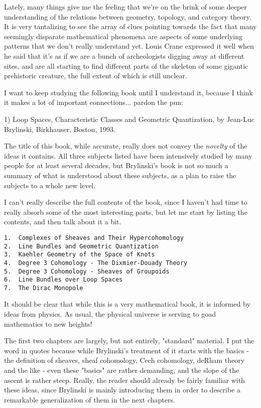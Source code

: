 

Lately, many things give me the feeling that we're on the brink of
some deeper understanding of the relations between geometry, topology,
and category theory.  It is very tantalizing to see the array of clues
pointing towards the fact that many seemingly disparate mathematical
phenomena are aspects of some underlying patterns that we don't really
understand yet.  Louis Crane expressed it well when he said that it's as
if we are a bunch of archeologists digging away at different sites,
and are all starting to find different parts of the skeleton of some
gigantic prehistoric creature, the full extent of which is still unclear.

I want to keep studying the following book until I understand it,
because I think it makes a lot of important connections... pardon the
pun:

1) Loop Spaces, Characteristic Classes and Geometric Quantization,
by Jean-Luc Brylinski, Birkhauser, Boston, 1993.

The title of this book, while accurate, really does not convey the
\emph{novelty} of the ideas it contains.  All three subjects listed have been
intensively studied by many people for at least several decades, but
Brylinski's book is not so much a summary of what is understood about
these subjects, as a plan to raise the subjects to a whole new level.

I can't really describe the full contents of the book, since I haven't
had time to really absorb some of the most interesting parts, but let me
start by listing the contents, and then talk about it a bit.

\begin{verbatim}
1.  Complexes of Sheaves and Their Hypercohomology
2.  Line Bundles and Geometric Quantization
3.  Kaehler Geometry of the Space of Knots
4.  Degree 3 Cohomology - The Dixmier-Douady Theory
5.  Degree 3 Cohomology - Sheaves of Groupoids
6.  Line Bundles over Loop Spaces
7.  The Dirac Monopole
\end{verbatim}
    

It should be clear that while this is a very mathematical book, it is
informed by ideas from physics.  As usual, the physical universe is
serving to goad mathematics to new heights!  

The first two chapters are largely, but not entirely, "standard"
material.  I put the word in quotes because while Brylinski's treatment
of it starts with the basics - the definition of sheaves, sheaf
cohomology, Cech cohomology, deRham theory and the like - even these
"basics" are rather demanding, and the slope of the ascent is rather
steep.   Really, the reader should already be fairly familiar with these
ideas, since Brylinski is mainly introducing them in order to describe a
remarkable generalization of them in the next chapters.  

